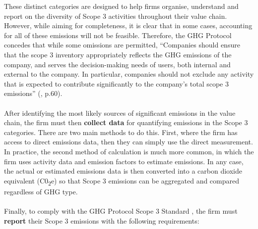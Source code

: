 \documentclass[12pt,twoside]{report}
\begin{document}
These distinct categories are designed to help firms organise, understand and report on the diversity of Scope 3 activities throughout their value chain. However, while aiming for completeness, it is clear that in some cases, accounting for all of these emissions will not be feasible.  Therefore, the GHG Protocol concedes that while some omissions are permitted, ``Companies should ensure that the scope 3 inventory appropriately reflects the GHG emissions of the company, and serves the decision-making needs of users, both internal and external to the company. In particular, companies should not exclude any activity that is expected to contribute significantly to the company's total scope 3 emissions'' (\cite{ghgscope32013}, p.60).  
\\ \\
After identifying the most likely sources of significant emissions in the value chain, the firm must then \textbf{collect data} for quantifying emissions in the Scope 3 categories. There are two main methods to do this. First, where the firm has access to direct emissions data, then they can simply use the direct measurement. In practice, the second method of calculation is much more common, in which the firm uses activity data and emission factors to estimate emissions. In any case, the actual or estimated emissions data is then converted into a carbon dioxide equivalent (C0\textsubscript{2}e) so that Scope 3 emissions can be aggregated and compared regardless of GHG type. 
\\ \\
Finally, to comply with the GHG Protocol Scope 3 Standard \cite{ghgscope32013}, the firm must \textbf{report} their Scope 3 emissions with the following requirements:
\end{document}
